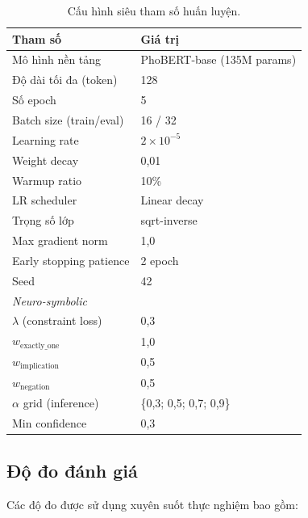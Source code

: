 \begin{table}[H]
\centering
\caption{Cấu hình siêu tham số huấn luyện.}
\label{tab:hyperparams}
\begin{tabular}{ll}
\toprule
\textbf{Tham số} & \textbf{Giá trị} \\
\midrule
Mô hình nền tảng     & PhoBERT-base (135M params) \\
Độ dài tối đa (token) & 128 \\
Số epoch              & 5 \\
Batch size (train/eval) & 16 / 32 \\
Learning rate         & $2 \times 10^{-5}$ \\
Weight decay          & 0,01 \\
Warmup ratio          & 10\% \\
LR scheduler          & Linear decay \\
Trọng số lớp          & sqrt-inverse \\
Max gradient norm     & 1,0 \\
Early stopping patience & 2 epoch \\
Seed                   & 42 \\
\midrule
\multicolumn{2}{l}{\textit{Neuro-symbolic}} \\
$\lambda$ (constraint loss)    & 0,3 \\
$w_{\text{exactly\_one}}$      & 1,0 \\
$w_{\text{implication}}$       & 0,5 \\
$w_{\text{negation}}$          & 0,5 \\
$\alpha$ grid (inference)      & \{0,3; 0,5; 0,7; 0,9\} \\
Min confidence                 & 0,3 \\
\bottomrule
\end{tabular}
\end{table}


\subsection{Độ đo đánh giá}
\label{subsec:metrics}

Các độ đo được sử dụng xuyên suốt thực nghiệm bao gồm:

